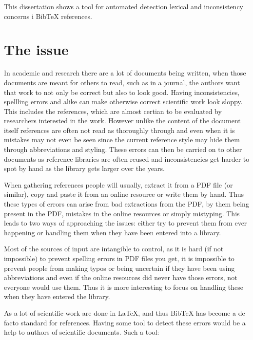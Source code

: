 
This dissertation shows a tool for automated detection lexical
and inconsistency concerns i Bib{\TeX} references.


\section{The issue}

In academic and research there are a lot of documents being written,
when those documents are meant for others to read, such as in a
journal, the authors want that work to not only be correct but also to
look good.  Having inconsistencies, spellling errors and alike can
make otherwise correct scientific work look sloppy.  This includes the
references, which are almost certian to be evaluated by researchers
interested in the work.  However unlike the content of the document
itself references are often not read as thoroughly through and even
when it is mistakes may not even be seen since the current reference
style may hide them through abbreviations and styling.  These errors
can then be carried on to other documents as reference libraries are
often reused and inconsistencies get harder to spot by hand as the
library gets larger over the years.

When gathering references people will usually, extract it from a PDF
file (or similar), copy and paste it from an online resource or write
them by hand.  Thus these types of errors can arise from bad
extractions from the PDF, by them being present in the PDF, mistakes
in the online resources or simply mistyping.  This leads to two ways
of approaching the issues: either try to prevent them from ever
happening or handling them when they have been entered into a library.

Most of the sources of input are intangible to control, as it is hard
(if not impossible) to prevent spelling errors in PDF files you get,
it is impossible to prevent people from making typos or being
uncertain if they have been using abbreviations and even if the online
resources did never have those errors, not everyone would use them.
Thus it is more interesting to focus on handling these when they have
entered the library.

As a lot of  scientific work are done in
{\LaTeX}, and thus Bib{\TeX} has become a de facto standard for
references.  Having some tool to detect these errors would be a help
to authors of scientific documents.  Such a tool:

